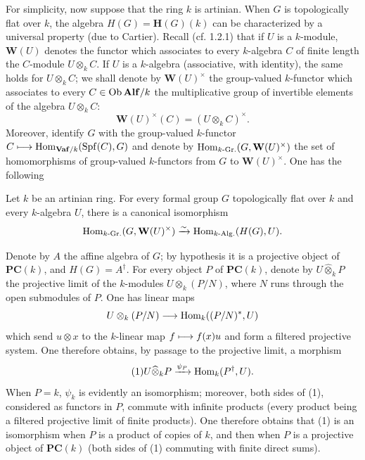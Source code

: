 For simplicity, now suppose that the ring $k$ is artinian. When $G$ is topologically flat over $k$, the algebra $H(G)=\mathbf H(G)(k)$ can be characterized by a universal property (due to Cartier). Recall (cf. 1.2.1) that if $U$ is a $k$-module, $\mathbf W(U)$ denotes the functor which associates to every $k$-algebra $C$ of finite length the $C$-module $U\otimes_k C$. If $U$ is a $k$-algebra (associative, with identity), the same holds for $U\otimes_k C$; we shall denote by $\mathbf W(U)^\times$ the group-valued $k$-functor which associates to every $C\in\operatorname{Ob}\mathbf{Alf}/k$ the multiplicative group of invertible elements of the algebra $U\otimes_k C$:
\[
\mathbf W(U)^\times(C)=(U\otimes_k C)^\times.
\]
Moreover, identify $G$ with the group-valued $k$-functor $C\longmapsto\operatorname{Hom}_{\mathbf{Vaf}/k}(\operatorname{Spf}(C),G)$ and denote by $\operatorname{Hom}_{k\text{-}\mathrm{Gr.}}(G,\mathbf W(U)^\times)$ the set of homomorphisms of group-valued $k$-functors from $G$ to $\mathbf W(U)^\times$. One has the following
\begin{proposition}{}
Let $k$ be an artinian ring. For every formal group $G$ topologically flat over $k$ and every $k$-algebra $U$, there is a canonical isomorphism
\[
\operatorname{Hom}_{k\text{-}\mathrm{Gr.}}(G,\mathbf W(U)^\times)\xrightarrow{\sim}\operatorname{Hom}_{k\text{-}\mathrm{Alg.}}(H(G),U).
\]
\end{proposition}
Denote by $A$ the affine algebra of $G$; by hypothesis it is a projective object of $\mathbf{PC}(k)$, and $H(G)=A^\dagger$. For every object $P$ of $\mathbf{PC}(k)$, denote by $U\widehat\otimes_k P$ the projective limit of the $k$-modules $U\otimes_k(P/N)$, where $N$ runs through the open submodules of $P$. One has linear maps
\[
U\otimes_k(P/N)\longrightarrow\operatorname{Hom}_k((P/N)^*,U)
\]
which send $u\otimes x$ to the $k$-linear map $f\longmapsto f(x)u$ and form a filtered projective system. One therefore obtains, by passage to the projective limit, a morphism
\begin{equation}\tag{1}
U\widehat\otimes_k P\xrightarrow{\psi_P}\operatorname{Hom}_k(P^\dagger,U).
\end{equation}
When $P=k$, $\psi_k$ is evidently an isomorphism; moreover, both sides of (1), considered as functors in $P$, commute with infinite products (every product being a filtered projective limit of finite products). One therefore obtains that (1) is an isomorphism when $P$ is a product of copies of $k$, and then when $P$ is a projective object of $\mathbf{PC}(k)$ (both sides of (1) commuting with finite direct sums).
